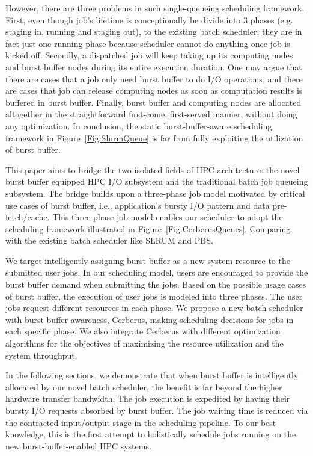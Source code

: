 However, there are three problems in such single-queueing scheduling framework.
First, even though job's lifetime is conceptionally be divide into 3 phases
(e.g. staging in, running and staging out), to the existing batch scheduler,
they are in fact just one running phase because scheduler cannot do anything once job is kicked off.
Secondly, a dispatched job will keep taking up its computing nodes and burst buffer nodes during its entire execution duration.
One may argue that there are cases that a job only need burst buffer to do I/O operations,
and there are cases that job can release computing nodes as soon as computation results is buffered
in burst buffer.
Finally, burst buffer and computing nodes are allocated altogether in the straightforward first-come, first-served manner, without doing any optimization.
In conclusion, the static burst-buffer-aware scheduling framework in Figure~\ref{Fig:SlurmQueue}
is far from fully exploiting the utilization of burst buffer.

This paper aims to bridge the two isolated fields of HPC architecture:
the novel burst buffer equipped HPC I/O subsystem and the
traditional batch job queueing subsystem.
The bridge builds upon a three-phase job model motivated by critical use cases of burst buffer,
i.e., application's bursty I/O pattern and data pre-fetch/cache.
This three-phase job model enables our scheduler to adopt the scheduling framework
illustrated in Figure~\ref{Fig:CerberusQueues}.
Comparing with the existing batch scheduler like SLRUM and PBS,

We target intelligently assigning burst buffer as a new system resource to the submitted user jobs.
In our scheduling model, users are encouraged to provide the burst buffer demand when submitting the jobs.
Based on the possible usage cases of burst buffer, the execution of user jobs is modeled into three phases.
The user jobs request different resources in each phase.
We propose a new batch scheduler with burst buffer awareness, Cerberus,
making scheduling decisions for jobs in each specific phase.
We also integrate Cerberus with different optimization algorithms for the
objectives of maximizing the resource utilization and the system throughput.

In the following sections, we demonstrate that when burst buffer is intelligently allocated
by our novel batch scheduler, the benefit is far beyond the higher hardware transfer bandwidth.
The job execution is expedited by having their bursty I/O requests absorbed by burst buffer.
The job waiting time is reduced via the contracted input/output stage in the scheduling pipeline.
To our best knowledge, this is the first attempt to holistically schedule jobs
running on the new burst-buffer-enabled HPC systems.


